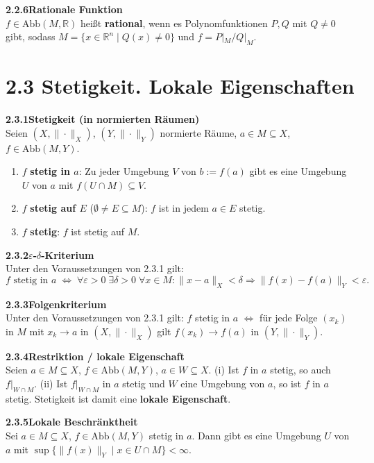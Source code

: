 \documentclass[a4paper,12pt]{article}
\newcommand{\gentry}[3]{%
  \noindent\textbf{#1\quad #2}\nopagebreak\\[0.2em]
  #3\par\smallskip
}
\begin{document}
\gentry{2.2.6}{Rationale Funktion}{%
  $f \in \mathrm{Abb}(M, \mathbb{R})$ heißt \textbf{rational}, wenn es
  Polynomfunktionen $P, Q$ mit $Q \neq 0$ gibt, sodass
  $M = \{x \in \mathbb{R}^n \mid Q(x) \neq 0\}$ und $f = P|_M / Q|_M$.
}

\section*{2.3 \quad Stetigkeit. Lokale Eigenschaften}

\gentry{2.3.1}{Stetigkeit (in normierten Räumen)}{%
  Seien $(X, \|\cdot\|_X)$, $(Y, \|\cdot\|_Y)$ normierte Räume, $a \in M \subseteq X$,
  $f \in \mathrm{Abb}(M, Y)$.
  \begin{enumerate}[label=(\roman*),topsep=2pt,itemsep=1pt]
    \item $f$ \textbf{stetig in $a$}: Zu jeder Umgebung $V$ von $b := f(a)$ gibt
          es eine Umgebung $U$ von $a$ mit $f(U \cap M) \subseteq V$.
    \item $f$ \textbf{stetig auf $E$} ($\emptyset \neq E \subseteq M$):
          $f$ ist in jedem $a \in E$ stetig.
    \item $f$ \textbf{stetig}: $f$ ist stetig auf $M$.
  \end{enumerate}
}

\gentry{2.3.2}{$\varepsilon$-$\delta$-Kriterium}{%
  Unter den Voraussetzungen von 2.3.1 gilt:
  \[
    f \text{ stetig in } a \;\Longleftrightarrow\;
    \forall \varepsilon > 0\;\exists \delta > 0\;\forall x \in M:
    \|x - a\|_X < \delta \Rightarrow \|f(x) - f(a)\|_Y < \varepsilon.
  \]
}

\gentry{2.3.3}{Folgenkriterium}{%
  Unter den Voraussetzungen von 2.3.1 gilt:
  $f$ stetig in $a$ $\Longleftrightarrow$ für jede Folge $(x_k)$ in $M$ mit
  $x_k \to a$ in $(X, \|\cdot\|_X)$ gilt $f(x_k) \to f(a)$ in $(Y, \|\cdot\|_Y)$.
}

\gentry{2.3.4}{Restriktion / lokale Eigenschaft}{%
  Seien $a \in M \subseteq X$, $f \in \mathrm{Abb}(M, Y)$, $a \in W \subseteq X$.
  (i) Ist $f$ in $a$ stetig, so auch $f|_{W \cap M}$.
  (ii) Ist $f|_{W \cap M}$ in $a$ stetig und $W$ eine Umgebung von $a$, so ist
  $f$ in $a$ stetig. Stetigkeit ist damit eine \textbf{lokale Eigenschaft}.
}

\gentry{2.3.5}{Lokale Beschränktheit}{%
  Sei $a \in M \subseteq X$, $f \in \mathrm{Abb}(M, Y)$ stetig in $a$. Dann gibt
  es eine Umgebung $U$ von $a$ mit $\sup\{\|f(x)\|_Y \mid x \in U \cap M\} < \infty$.
}
\end{document}
